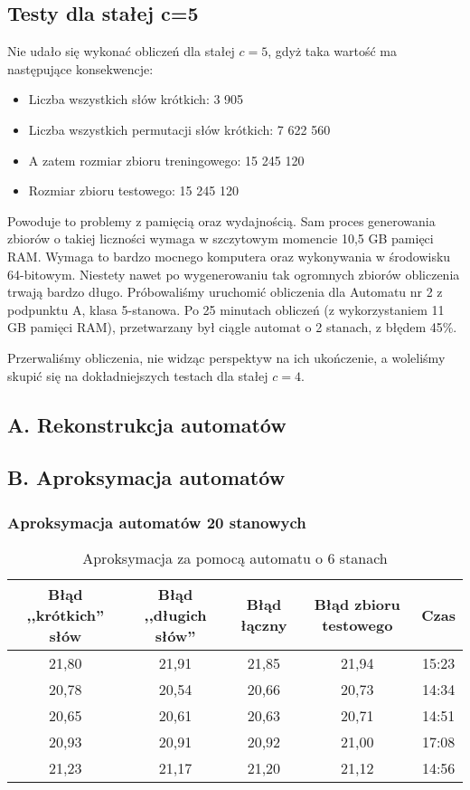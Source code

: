 \documentclass{../llncs_template_final/llncs}
\begin{document}
\subsection{Testy dla stałej c=5}
Nie udało się wykonać obliczeń dla stałej $c = 5$, gdyż taka wartość ma następujące konsekwencje:
\begin{itemize}
\item Liczba wszystkich słów krótkich: 3 905
\item Liczba wszystkich permutacji słów krótkich: 7 622 560
\item A zatem rozmiar zbioru treningowego: 15 245 120
\item Rozmiar zbioru testowego: 15 245 120
\end{itemize}

Powoduje to problemy z pamięcią oraz wydajnością. Sam proces generowania zbiorów o takiej liczności wymaga w szczytowym momencie 10,5 GB pamięci RAM. Wymaga to bardzo mocnego komputera oraz wykonywania w środowisku 64-bitowym.
Niestety nawet po wygenerowaniu tak ogromnych zbiorów obliczenia trwają bardzo długo. Próbowaliśmy uruchomić obliczenia dla Automatu nr 2 z podpunktu A, klasa 5-stanowa. Po 25 minutach obliczeń (z wykorzystaniem 11 GB pamięci RAM), przetwarzany był ciągle automat o 2 stanach, z błędem 45\%. 

Przerwaliśmy obliczenia, nie widząc perspektyw na ich ukończenie, a woleliśmy skupić się na dokładniejszych testach dla stałej $c = 4$.

\subsection{A. Rekonstrukcja automatów}

\newpage

\subsection{B. Aproksymacja automatów} 

\subsubsection{Aproksymacja automatów 20 stanowych} 

\begin{table}[] 
\centering 
\caption{Aproksymacja za pomocą automatu o 6 stanach}  
\begin{tabular}{| c | c | c | c | c |} 
\hline Błąd ,,krótkich'' słów & Błąd ,,długich słów'' & Błąd łączny & Błąd zbioru testowego & Czas \\ [0.5ex] 
\hline 21,80 & 21,91 & 21,85 & 21,94 & 15:23 \\ 
\hline 20,78 & 20,54 & 20,66 & 20,73 & 14:34 \\ 
\hline 20,65 & 20,61 & 20,63 & 20,71 & 14:51 \\ 
\hline 20,93 & 20,91 & 20,92 & 21,00 & 17:08 \\ 
\hline 21,23 & 21,17 & 21,20 & 21,12 & 14:56 \\ 
\hline 
\end{tabular} 
\end{table} 
\end{document}
